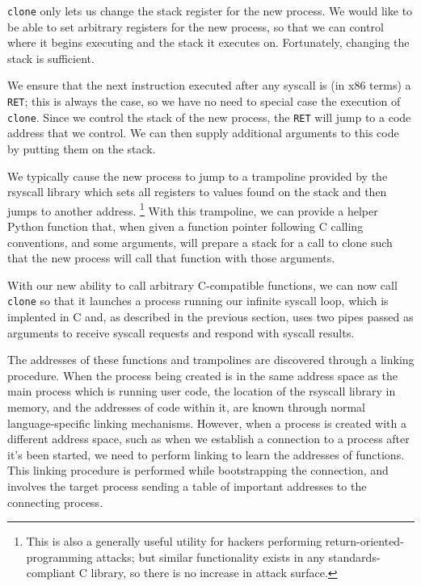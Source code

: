 \documentclass[sigplan]{acmart}
\begin{document}
\texttt{clone} only lets us change the stack register for the new process.
We would like to be able to set arbitrary registers for the new process,
so that we can control where it begins executing and the stack it executes on.
Fortunately, changing the stack is sufficient.

We ensure that the next instruction executed after any syscall
is (in x86 terms) a \texttt{RET};
this is always the case, so we have no need to special case the execution of \texttt{clone}.
Since we control the stack of the new process,
the \texttt{RET} will jump to a code address that we control.
We can then supply additional arguments to this code
by putting them on the stack.

We typically cause the new process to jump to a trampoline provided by the rsyscall library
which sets all registers to values found on the stack
and then jumps to another address.
\footnote{This is also a generally useful utility for hackers performing return-oriented-programming attacks;
but similar functionality exists in any standards-compliant C library,
so there is no increase in attack surface.}
With this trampoline,
we can provide a helper Python function that,
when given a function pointer following C calling conventions, and some arguments,
will prepare a stack for a call to clone such that the new process will call that function with those arguments.

With our new ability to call arbitrary C-compatible functions,
we can now call \texttt{clone} so that it launches a process running our infinite syscall loop,
which is implented in C and, as described in the previous section,
uses two pipes passed as arguments to receive syscall requests and respond with syscall results.

The addresses of these functions and trampolines are discovered through a linking procedure.
When the process being created is in the same address space as the main process which is running user code,
the location of the rsyscall library in memory, and the addresses of code within it,
are known through normal language-specific linking mechanisms.
However, when a process is created with a different address space,
such as when we establish a connection to a process after it's been started,
we need to perform linking to learn the addresses of functions.
This linking procedure is performed while bootstrapping the connection,
and involves the target process sending a table of important addresses to the connecting process.
\end{document}

